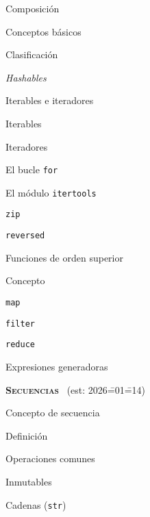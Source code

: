 \begin{longenum}
\begin{longenum}
        \begin{longenum}
            \item Composición
            \item Conceptos básicos
            \item Clasificación
            \item \textit{Hashables}
        \end{longenum}
        \item Iterables e iteradores
        \begin{longenum}
            \item Iterables
            \item Iteradores
            \begin{longenum}
                \item El bucle \texttt{for}
                \item El módulo \texttt{itertools}
                \item \texttt{zip}
                \item \texttt{reversed}
            \end{longenum}
        \end{longenum}
        \item Funciones de orden superior
        \begin{longenum}
            \item Concepto
            \item \texttt{map}
            \item \texttt{filter}
            \item \texttt{reduce}
            \item Expresiones generadoras
        \end{longenum}
    \end{longenum}
    \item \textbf{\textsc{Secuencias}} \ (est: 2026\==01\==14)
    \begin{longenum}
        \item Concepto de secuencia
        \begin{longenum}
            \item Definición
            \item Operaciones comunes
        \end{longenum}
        \item Inmutables
        \begin{longenum}
            \item Cadenas (\texttt{str})
            \begin{longenum}

\end{longenum}
\end{longenum}
\end{longenum}
\end{longenum}
